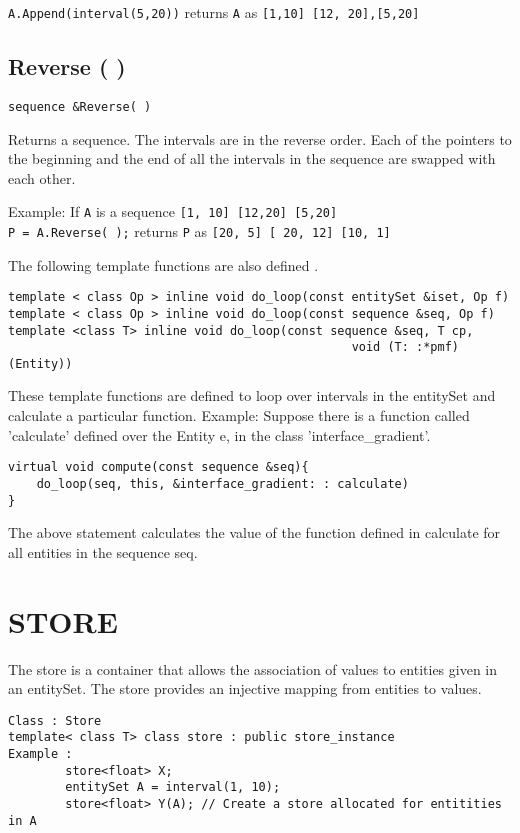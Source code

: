 \documentclass[letterpaper,12pt]{article}
\begin{document}
            {\tt  A.Append(interval(5,20))} returns {\tt A} as {\tt [1,10] [12, 20],[5,20]}

\subsection{Reverse ( )}
\begin{verbatim}
sequence &Reverse( )
\end{verbatim}

Returns a sequence. The intervals are in the reverse order. Each of
the pointers to the beginning and the end of all the intervals in the
sequence are swapped with each other.

Example: If {\tt A} is a sequence {\tt [1, 10] [12,20] [5,20]} \\
       {\tt  P = A.Reverse( );} returns {\tt P} as {\tt [20, 5] [ 20, 12] [10, 1]}

The following template functions are also defined .

\begin{verbatim}
template < class Op > inline void do_loop(const entitySet &iset, Op f)
template < class Op > inline void do_loop(const sequence &seq, Op f)
template <class T> inline void do_loop(const sequence &seq, T cp, 
                                                void (T: :*pmf)(Entity))
\end{verbatim}

These template functions are defined to loop over intervals in the
entitySet and calculate a particular function.  Example: Suppose there
is a function called 'calculate' defined over the Entity e, in the
class 'interface\_gradient'.  

\begin{verbatim}
virtual void compute(const sequence &seq){ 
    do_loop(seq, this, &interface_gradient: : calculate) 
}
\end{verbatim}

The above statement calculates the value of the function defined in
calculate for all entities in the sequence seq.



\newpage
\section{STORE}

The store is a container that allows the association of values to
entities given in an entitySet. The store provides an injective
mapping from entities to values.
\begin{verbatim}
Class : Store
template< class T> class store : public store_instance
Example : 
        store<float> X;
        entitySet A = interval(1, 10);
        store<float> Y(A); // Create a store allocated for entitities in A
\end{verbatim}
\end{document}
